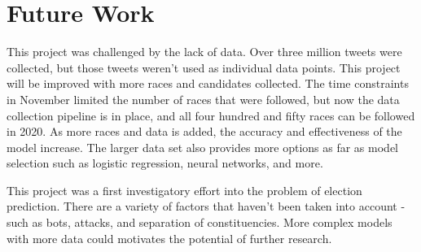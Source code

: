 \documentclass[11pt, twoside, reqno]{book}
\begin{document}
\section{Future Work}
\hspace{0.2in} This project was challenged by the lack of data. Over three million tweets were collected, but those tweets weren't used as individual data points. This project will be improved with more races and candidates collected. The time constraints in November limited the number of races that were followed, but now the data collection pipeline is in place, and all four hundred and fifty races can be followed in 2020. As more races and data is added, the accuracy and effectiveness of the model increase. The larger data set also provides more options as far as model selection such as logistic regression, neural networks, and more. 

This project was a first investigatory effort into the problem of election prediction. There are a variety of factors that haven't been taken into account - such as bots, attacks, and separation of constituencies. More complex models with more data could motivates the potential of further research. 
\end{document}

